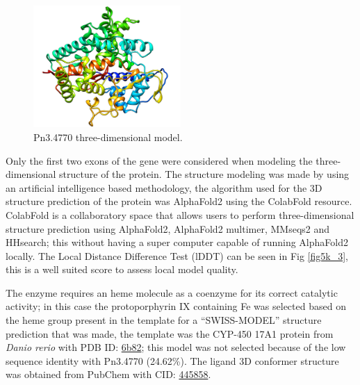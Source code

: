 \documentclass[12pt]{article}
\begin{document}
	\FloatBarrier
	\begin{figure}
		\centering
		\includegraphics[width=0.5\textwidth]{../5/known/Minimize/model2.png}
		\caption{\centering Pn3.4770 three-dimensional model.}
		\label{fig5k_2}
	\end{figure}
	\FloatBarrier
	
	Only the first two exons of the gene were considered when modeling the three-dimensional structure of the protein. The structure modeling was made by using an artificial intelligence based methodology, the algorithm used for the 3D structure prediction of the protein was AlphaFold2 using the ColabFold resource. \cite{alphafold,colabfold} ColabFold is a collaboratory space that allows users to perform three-dimensional structure prediction using AlphaFold2, AlphaFold2 multimer, MMseqs2 and HHsearch; this without having a super computer capable of running AlphaFold2 locally. The Local Distance Difference Test (lDDT) can be seen in Fig \ref{fig5k_3}, this is a well suited score to assess local model quality. \cite{lddt}
	
	The enzyme requires an heme molecule as a coenzyme for its correct catalytic activity; in this case the protoporphyrin IX containing Fe was selected based on the heme group present in the template for a ``SWISS-MODEL'' structure prediction that was made, the template was the CYP-450 17A1 protein from \textit{Danio rerio} with PDB ID: \href{https://www.rcsb.org/structure/6b82}{6b82}; this model was not selected because of the low sequence identity with Pn3.4770 (24.62\%). The ligand 3D conformer structure was obtained from PubChem with CID: \href{https://pubchem.ncbi.nlm.nih.gov/compound/445858}{445858}.
	
\end{document}
